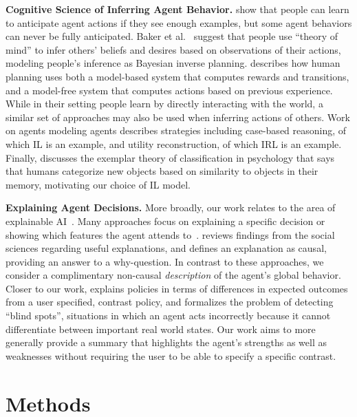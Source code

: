 \documentclass{article}
\begin{document}
\textbf{Cognitive Science of Inferring Agent Behavior.}
\cite{dragan2014familiarization} show that people can learn to anticipate agent actions if they see enough examples, but some agent behaviors can never be fully anticipated. Baker et al.~ suggest that people use ``theory of mind'' to infer others' beliefs and desires based on observations of their actions, modeling people's inference as Bayesian inverse planning. \cite{daw2005arbitration} describes how human planning uses both a model-based system that computes rewards and transitions, and a model-free system that computes actions based on previous experience. While in their setting people learn by directly interacting with the world, a similar set of approaches may also be used when inferring actions of others. Work on agents modeling agents \cite{albrecht2018modeling} describes strategies including case-based reasoning, of which IL is an example, and utility reconstruction, of which IRL is an example. Finally, \cite{medin19778context} discusses the exemplar theory of classification in psychology that says that humans categorize new objects based on similarity to objects in their memory, motivating our choice of IL model.

\textbf{Explaining Agent Decisions.}
More broadly, our work relates to the area of explainable AI~\cite{aha2017ijcai}. Many approaches focus on explaining a specific decision \cite{khan2009minimal,lomas2012explaining,dodson2011natural,broekens2010explain} or showing which features the agent attends to~\cite{greydanus2017visualizing}. \cite{miller2018explanation} reviews findings from the social sciences regarding useful explanations, and defines an explanation as causal, providing an answer to a why-question. In contrast to these approaches, we consider a complimentary non-causal \emph{description} of the agent's global behavior. Closer to our work, \cite{vanderwaa2018contrastive} explains policies in terms of differences in expected outcomes from a user specified, contrast policy, and \cite{ramakrishnan2018blindspot} formalizes the problem of detecting ``blind spots'', situations in which an agent acts incorrectly because it cannot differentiate between important real world states. Our work aims to more generally provide a summary that highlights the agent's strengths as well as weaknesses without requiring the user to be able to specify a specific contrast.

\section{Methods}
\label{sec:methods}
\end{document}
